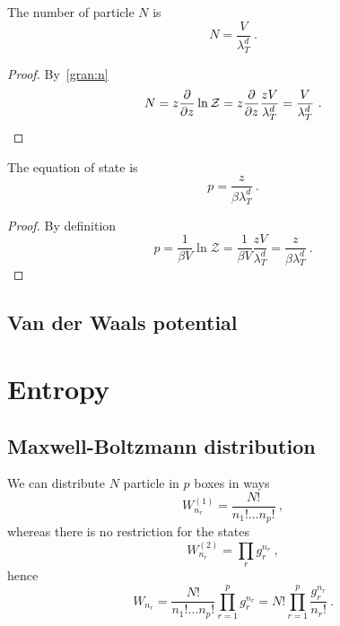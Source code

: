     The number of particle $N$ is 
    \begin{equation*}
        N = \frac{V}{\lambda_T^d} ~.
    \end{equation*}
    \begin{proof}
        By~\eqref{gran:n}
        \begin{equation*}
            N = z \frac{\partial}{\partial z} \ln \mathcal Z = z \frac{\partial}{\partial z} \frac{z V}{\lambda_T^d} = \frac{V}{\lambda_T^d} ~.
        \end{equation*}
    \end{proof}
    
    The equation of state is 
    \begin{equation*}
        p = \frac{z}{\beta \lambda_T^d} ~.
    \end{equation*}
    \begin{proof}
        By definition
        \begin{equation*}
            p = \frac{1}{\beta V} \ln \mathcal Z = \frac{1}{\beta V} \frac{z V}{\lambda_T^d} = \frac{z}{\beta \lambda_T^d} ~.
        \end{equation*}
    \end{proof}

\section{Van der Waals potential}

\chapter{Entropy}

\section{Maxwell-Boltzmann distribution}

    We can distribute $N$ particle in $p$ boxes in ways 
    \begin{equation*}
        W^{(1)}_{n_r} = \frac{N!}{n_1! \ldots n_p!} ~,
    \end{equation*}
    whereas there is no restriction for the states 
    \begin{equation*}
        W^{(2)}_{n_r} = \prod_r g_r^{n_r} ~,
    \end{equation*}
    hence 
    \begin{equation*}
        W_{n_r} = \frac{N!}{n_1! \ldots n_p!} \prod_{r=1}^p g_r^{n_r} = N! \prod_{r=1}^p \frac{g_r^{n_r}}{n_r!} ~.
    \end{equation*}

